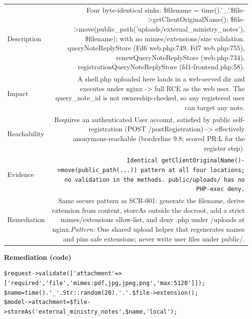 \documentclass[11pt,a4paper]{article}
\begin{document}
{\renewcommand{\arraystretch}{1.35}%
\begin{tabularx}{\textwidth}{L R}
\toprule
Description & Four byte-identical sinks: \$filename = time().'\_'.\$file-\textgreater{}getClientOriginalName(); \$file-\textgreater{}move(public\_path('uploads/external\_ministry\_notes'), \$filename); with no mimes/extensions/size validation. queryNoteReplyStore (Fd6 web.php:749, Fd7 web.php:755), renewQueryNoteReplyStore (web.php:734), registrationQueryNoteReplyStore (fd1-frontend.php:58). \\
Impact & A shell.php uploaded here lands in a web-served dir and executes under nginx -\textgreater{} full RCE as the web user. The query\_note\_id is not ownership-checked, so any registered user can target any note. \\
Reachability & Requires an authenticated User account, satisfied by public self-registration (POST /postRegistration) -\textgreater{} effectively anonymous-reachable (borderline 9.8; scored PR:L for the register step). \\
Evidence & \texttt{\small Identical getClientOriginalName()-\textgreater{}move(public\_path(...)) pattern at all four locations; no validation in the methods. public/uploads/ has no PHP-exec deny.} \\
Remediation & Same secure pattern as SCR-001: generate the filename, derive extension from content, storeAs outside the docroot, add a strict mimes/extensions allow-list, and deny .php under /uploads at nginx.\newline\emph{Pattern:} One shared upload helper that regenerates names and pins safe extensions; never write user files under public/. \\
\bottomrule
\end{tabularx}}

\vspace{4pt}\noindent\textbf{Remediation (code)}\par
\begin{lstlisting}
$request->validate(['attachment'=>['required','file','mimes:pdf,jpg,jpeg,png','max:5120']]);
$name=time().'_'.Str::random(20).'.'.$file->extension();
$model->attachment=$file->storeAs('external_ministry_notes',$name,'local');
\end{lstlisting}
\end{document}
